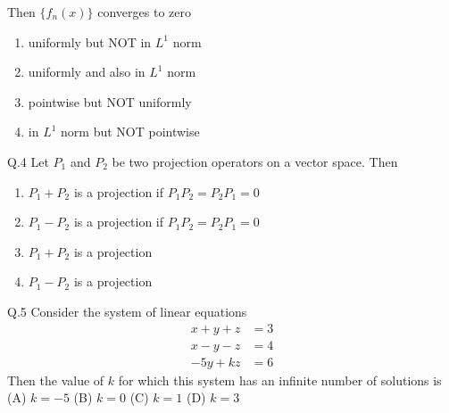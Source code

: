 \documentclass{article}
\begin{document}
																				    Then $\{f_n(x)\}$ converges to zero
																				    \vspace{1em}
																				    \begin{enumerate}
																				        \item[(A)] uniformly but NOT in $L^1$ norm
																					    \item[(B)] uniformly and also in $L^1$ norm
																					        \item[(C)] pointwise but NOT uniformly
																						    \item[(D)] in $L^1$ norm but NOT pointwise
																						    \end{enumerate}
																						    \vspace{1em}
																						    Q.4 \quad Let $P_1$ and $P_2$ be two projection operators on a vector space. Then
																						    \begin{enumerate}
																						        \item[(A)] $P_1 + P_2$ is a projection if $P_1 P_2 = P_2 P_1 = 0$
																							    \item[(B)] $P_1 - P_2$ is a projection if $P_1 P_2 = P_2 P_1 = 0$
																							        \item[(C)] $P_1 + P_2$ is a projection
																								    \item[(D)] $P_1 - P_2$ is a projection
																								    \end{enumerate}

																								    \vspace{1em}

																								    Q.5 \quad Consider the system of linear equations
																								    \[
																								    \begin{aligned}
																								    x + y + z &= 3 \\
																								    x - y - z &= 4 \\
																								    -5y + kz &= 6
																								    \end{aligned}
																								    \]
																								    Then the value of $k$ for which this system has an infinite number of solutions is
																								    \vspace{1em}
																								    \newline 
																								    \noindent (A) $k = -5$ \hspace{2cm} (B) $k = 0$ \hspace{2cm}(C) $k = 1$ \hspace{2cm} (D) $k = 3$
\end{document}
